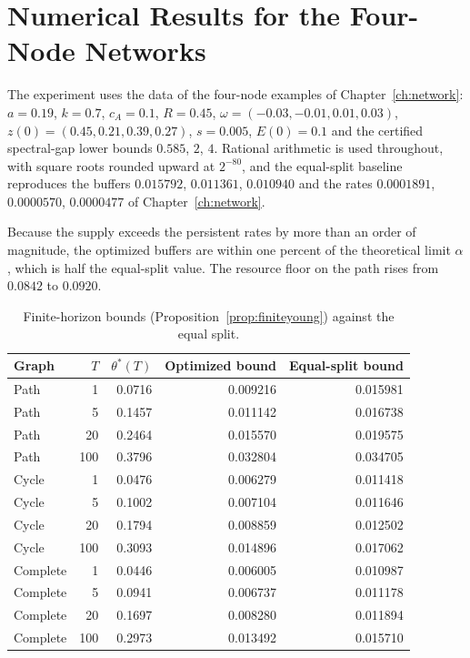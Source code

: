 \documentclass[11pt,notitlepage]{report}
\theoremstyle{definition}
\theoremstyle{remark}
\begin{document}
\section{Numerical Results for the Four-Node Networks}
The experiment uses the data of the four-node examples of Chapter~\ref{ch:network}: $a=0.19$, $k=0.7$, $c_A=0.1$, $R=0.45$, $\omega=(-0.03,-0.01,0.01,0.03)$, $z(0)=(0.45,0.21,0.39,0.27)$, $s=0.005$, $E(0)=0.1$ and the certified spectral-gap lower bounds $0.585$, $2$, $4$. Rational arithmetic is used throughout, with square roots rounded upward at $2^{-80}$, and the equal-split baseline reproduces the buffers $0.015792$, $0.011361$, $0.010940$ and the rates $0.0001891$, $0.0000570$, $0.0000477$ of Chapter~\ref{ch:network}.
\begin{table}[ht]\centering\small
\caption{Supply-matched allocation (Proposition~\ref{prop:supplymatched}) for $s=0.005$.}\label{tab:youngdata}
\end{table}
Because the supply exceeds the persistent rates by more than an order of magnitude, the optimized buffers are within one percent of the theoretical limit $\alpha$, which is half the equal-split value. The resource floor on the path rises from $0.0842$ to $0.0920$.
\begin{table}[ht]\centering\small
\caption{Finite-horizon bounds (Proposition~\ref{prop:finiteyoung}) against the equal split.}
\begin{tabular}{lrrrr}\toprule
Graph&$T$&$\theta^*(T)$&Optimized bound&Equal-split bound\\\midrule
Path&1&0.0716&0.009216&0.015981\\
Path&5&0.1457&0.011142&0.016738\\
Path&20&0.2464&0.015570&0.019575\\
Path&100&0.3796&0.032804&0.034705\\
Cycle&1&0.0476&0.006279&0.011418\\
Cycle&5&0.1002&0.007104&0.011646\\
Cycle&20&0.1794&0.008859&0.012502\\
Cycle&100&0.3093&0.014896&0.017062\\
Complete&1&0.0446&0.006005&0.010987\\
Complete&5&0.0941&0.006737&0.011178\\
Complete&20&0.1697&0.008280&0.011894\\
Complete&100&0.2973&0.013492&0.015710\\\bottomrule
\end{tabular}
\end{table}
\end{document}
